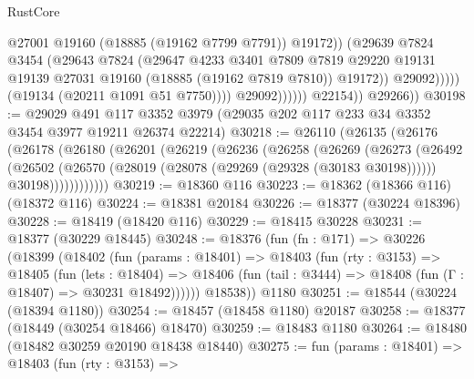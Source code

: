 \begin{lexlean}{RustCore}
\begin{coremodule}
                                        @27001
                                        @19160
                                        (@18885 (@19162 @7799 @7791))
                                        @19172))
                                    (@29639
                                      @7824
                                      @3454
                                      (@29643
                                        @7824
                                        (@29647
                                          @4233
                                          @3401
                                          @7809
                                          @7819
                                          @29220
                                          @19131
                                          @19139
                                          @27031
                                          @19160
                                          (@18885 (@19162 @7819 @7810))
                                          @19172))
                                      @29092)))))
                            (@19134 (@20211 @1091 @51 @7750))))
                        @29092))))))
            @22154))
        @29266))
@30198 := @29029
    @491
    @117
    @3352
    @3979
    (@29035 @202 @117 @233 @34 @3352 @3454 @3977 @19211 @26374 @22214)
@30218 := @26110
    (@26135
      (@26176
        (@26178
          (@26180
            (@26201
              (@26219
                (@26236
                  (@26258
                    (@26269
                      (@26273
                        (@26492
                          (@26502
                            (@26570 (@28019 (@28078 (@29269 (@29328 (@30183 @30198))))))
                            @30198))))))))))))
@30219 := @18360 @116
@30223 := @18362 (@18366 @116) (@18372 @116)
@30224 := @18381 @20184
@30226 := @18377 (@30224 @18396)
@30228 := @18419 (@18420 @116)
@30229 := @18415 @30228
@30231 := @18377 (@30229 @18445)
@30248 := @18376
    (fun (fn : @171) =>
    @30226
      (@18399
        (@18402
          (fun (params : @18401) =>
          @18403
            (fun (rty : @3153) =>
            @18405
              (fun (lets : @18404) =>
              @18406 (fun (tail : @3444) => @18408 (fun (Γ : @18407) => @30231 @18492))))))
        @18538))
    @1180
@30251 := @18544 (@30224 (@18394 @1180))
@30254 := @18457 (@18458 @1180) @20187
@30258 := @18377 (@18449 (@30254 @18466) @18470)
@30259 := @18483 @1180
@30264 := @18480 (@18482 @30259 @20190 @18438 @18440)
@30275 := fun (params : @18401) =>
  @18403
    (fun (rty : @3153) =>

\end{coremodule}
\end{lexlean}
